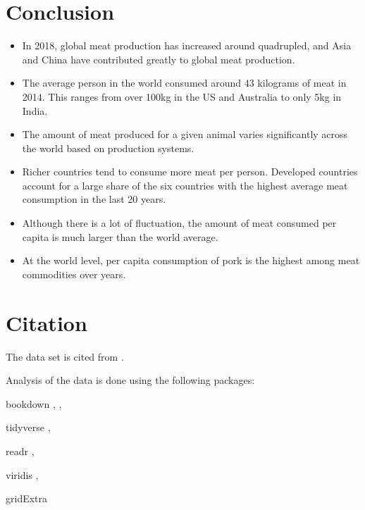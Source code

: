 \documentclass[11pt,a4paper,]{article}
\begin{document}
\clearpage

\hypertarget{conclusion}{%
\section{Conclusion}\label{conclusion}}

\begin{itemize}
\item
  In 2018, global meat production has increased around quadrupled, and Asia and China have contributed greatly to global meat production.
\item
  The average person in the world consumed around 43 kilograms of meat in 2014. This ranges from over 100kg in the US and Australia to only 5kg in India.
\item
  The amount of meat produced for a given animal varies significantly across the world based on production systems.
\item
  Richer countries tend to consume more meat per person. Developed countries account for a large share of the six countries with the highest average meat consumption in the last 20 years.
\item
  Although there is a lot of fluctuation, the amount of meat consumed per capita is much larger than the world average.
\item
  At the world level, per capita consumption of pork is the highest among meat commodities over years.
\end{itemize}

\section*{Citation}

The data set is cited from \textcite{owidmeatproduction}.

Analysis of the data is done using the following packages:

bookdown \textcite{bookdown1}, \textcite{bookdown2},

tidyverse \textcite{tidyverse},

readr \textcite{readr},

viridis \textcite{viridis},

gridExtra \textcite{gridExtra}

\printbibliography
\end{document}
